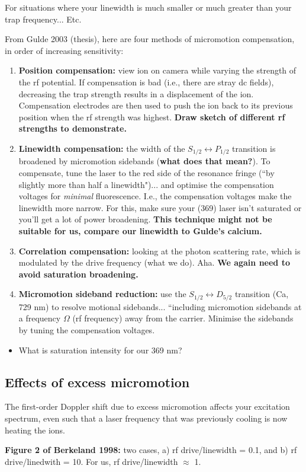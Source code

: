 \documentclass{article}
\begin{document}
For situations where your linewidth is much smaller or much greater than your trap frequency... Etc.

From Gulde 2003 (thesis), here are four methods of micromotion compensation, in order of increasing sensitivity:

\begin{enumerate}
\item \textbf{Position compensation:} view ion on camera while varying the strength of the rf potential. If compensation is bad (i.e., there are stray dc fields), decreasing the trap strength results in a displacement of the ion. Compensation electrodes are then used to push the ion back to its previous position when the rf strength was highest. \textbf{Draw sketch of different rf strengths to demonstrate.}

\item \textbf{Linewidth compensation:} the width of the $S_{1/2} \leftrightarrow P_{1/2}$ transition is broadened by micromotion sidebands (\textbf{what does that mean?}). To compensate, tune the laser to the red side of the resonance fringe (``by slightly more than half a linewidth")... and optimise the compensation voltages for \textit{minimal} fluorescence. I.e., the compensation voltages make the linewidth more narrow. For this, make sure your (369) laser isn't saturated or you'll get a lot of power broadening. \textbf{This technique might not be suitable for us, compare our linewidth to Gulde's calcium.}

\item \textbf{Correlation compensation:} looking at the photon scattering rate, which is modulated by the drive frequency (what we do). Aha. \textbf{We again need to avoid saturation broadening.}

\item \textbf{Micromotion sideband reduction:} use the $S_{1/2} \leftrightarrow D_{5/2}$ transition (Ca, 729 nm) to resolve motional sidebands... ``including micromotion sidebands at a frequency $\Omega$ (rf frequency) away from the carrier. Minimise the sidebands by tuning the compensation voltages.
\end{enumerate}

\begin{itemize}
\item What is saturation intensity for our 369 nm?
\end{itemize}


\subsection*{Effects of excess micromotion}

The first-order Doppler shift due to excess micromotion affects your excitation spectrum, even such that a laser frequency that was previously cooling is now heating the ions.

\textbf{Figure 2 of Berkeland 1998:} two cases, a) rf drive/linewidth = 0.1, and b) rf drive/linedwith = 10. For us, rf drive/linewidth $\approx$ 1.
\end{document}
